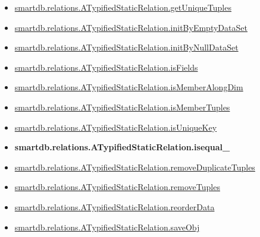 \documentclass[letterpaper,10pt,english]{sphinxmanual}
\begin{document}
\begin{itemize}
\item {} 
{\hyperref[chap_functions:smartdb-relations-atypifiedstaticrelation-getuniquetuples]{smartdb.relations.ATypifiedStaticRelation.getUniqueTuples}}

\item {} 
{\hyperref[chap_functions:smartdb-relations-atypifiedstaticrelation-initbyemptydataset]{smartdb.relations.ATypifiedStaticRelation.initByEmptyDataSet}}

\item {} 
{\hyperref[chap_functions:smartdb-relations-atypifiedstaticrelation-initbynulldataset]{smartdb.relations.ATypifiedStaticRelation.initByNullDataSet}}

\item {} 
{\hyperref[chap_functions:smartdb-relations-atypifiedstaticrelation-isfields]{smartdb.relations.ATypifiedStaticRelation.isFields}}

\item {} 
{\hyperref[chap_functions:smartdb-relations-atypifiedstaticrelation-ismemberalongdim]{smartdb.relations.ATypifiedStaticRelation.isMemberAlongDim}}

\item {} 
{\hyperref[chap_functions:smartdb-relations-atypifiedstaticrelation-ismembertuples]{smartdb.relations.ATypifiedStaticRelation.isMemberTuples}}

\item {} 
{\hyperref[chap_functions:smartdb-relations-atypifiedstaticrelation-isuniquekey]{smartdb.relations.ATypifiedStaticRelation.isUniqueKey}}

\item {} 
{\color{red}\bfseries{}smartdb.relations.ATypifiedStaticRelation.isequal\_}

\item {} 
{\hyperref[chap_functions:smartdb-relations-atypifiedstaticrelation-removeduplicatetuples]{smartdb.relations.ATypifiedStaticRelation.removeDuplicateTuples}}

\item {} 
{\hyperref[chap_functions:smartdb-relations-atypifiedstaticrelation-removetuples]{smartdb.relations.ATypifiedStaticRelation.removeTuples}}

\item {} 
{\hyperref[chap_functions:smartdb-relations-atypifiedstaticrelation-reorderdata]{smartdb.relations.ATypifiedStaticRelation.reorderData}}

\item {} 
{\hyperref[chap_functions:smartdb-relations-atypifiedstaticrelation-saveobj]{smartdb.relations.ATypifiedStaticRelation.saveObj}}


\end{itemize}
\end{document}

